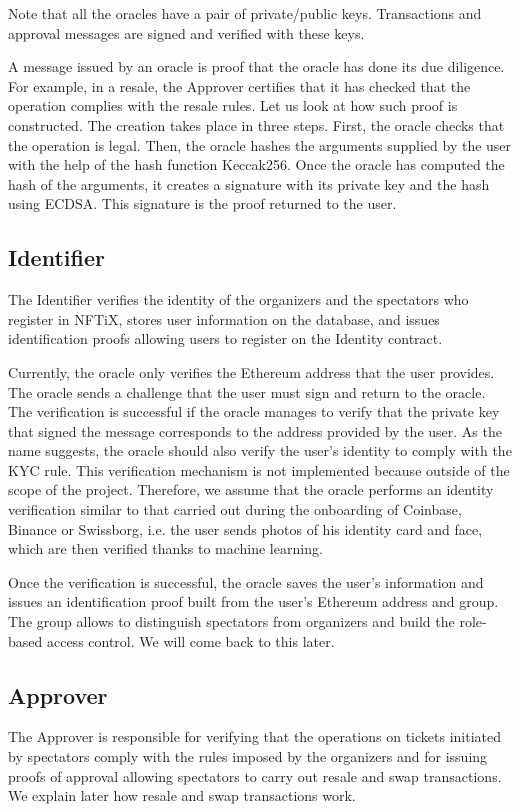 \documentclass[a4paper,11pt,oneside]{report}
\begin{document}
Note that all the oracles have a pair of private/public keys. Transactions and approval messages are signed and verified with these keys.

A message issued by an oracle is proof that the oracle has done its due diligence. For example, in a resale, the Approver certifies that it has checked that the operation complies with the resale rules. Let us look at how such proof is constructed. The creation takes place in three steps. First, the oracle checks that the operation is legal. Then, the oracle hashes the arguments supplied by the user with the help of the hash function Keccak256. Once the oracle has computed the hash of the arguments, it creates a signature with its private key and the hash using ECDSA. This signature is the proof returned to the user.

\subsection{Identifier}
The Identifier verifies the identity of the organizers and the spectators who register in NFTiX, stores user information on the database, and issues identification proofs allowing users to register on the Identity contract.

Currently, the oracle only verifies the Ethereum address that the user provides. The oracle sends a challenge that the user must sign and return to the oracle. The verification is successful if the oracle manages to verify that the private key that signed the message corresponds to the address provided by the user. As the name suggests, the oracle should also verify the user's identity to comply with the KYC rule. This verification mechanism is not implemented because outside of the scope of the project. Therefore, we assume that the oracle performs an identity verification similar to that carried out during the onboarding of Coinbase, Binance or Swissborg, i.e. the user sends photos of his identity card and face, which are then verified thanks to machine learning.

Once the verification is successful, the oracle saves the user's information and issues an identification proof built from the user's Ethereum address and group. The group allows to distinguish spectators from organizers and build the role-based access control. We will come back to this later.

\subsection{Approver}
The Approver is responsible for verifying that the operations on tickets initiated by spectators comply with the rules imposed by the organizers and for issuing proofs of approval allowing spectators to carry out resale and swap transactions. We explain later how resale and swap transactions work.
\end{document}
